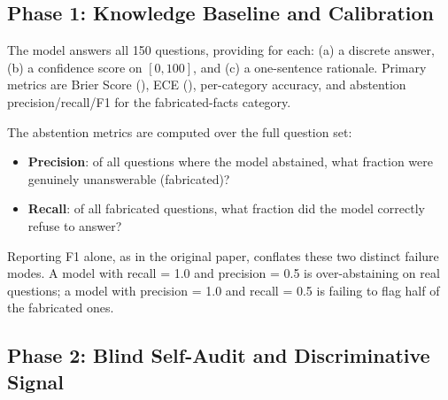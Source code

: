 \documentclass[12pt,a4paper]{article}
\begin{document}
\subsection{Phase 1: Knowledge Baseline and Calibration}

The model answers all 150 questions, providing for each: (a) a discrete answer, (b) a
confidence score on $[0, 100]$, and (c) a one-sentence rationale. Primary metrics are
Brier Score (), ECE (), per-category accuracy, and
abstention precision/recall/F1 for the fabricated-facts category.

The abstention metrics are computed over the full question set:
\begin{itemize}
    \item \textbf{Precision}: of all questions where the model abstained, what fraction
          were genuinely unanswerable (fabricated)?
    \item \textbf{Recall}: of all fabricated questions, what fraction did the model correctly
          refuse to answer?
\end{itemize}

Reporting F1 alone, as in the original paper, conflates these two distinct failure modes.
A model with recall = 1.0 and precision = 0.5 is over-abstaining on real questions; a model
with precision = 1.0 and recall = 0.5 is failing to flag half of the fabricated ones.

\subsection{Phase 2: Blind Self-Audit and Discriminative Signal}
\end{document}
